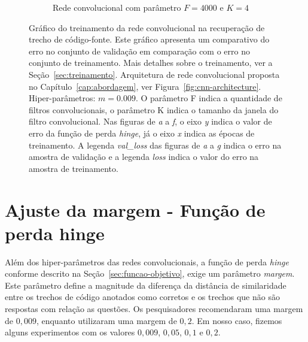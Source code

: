 \begin{figure}[H]
\begin{subfigure}{.5\textwidth}
  \caption{Rede convolucional com parâmetro $F = 4000$ e $K = 4$}
  \label{fig:cnn-4000-k-4}
\end{subfigure}
\caption{Gráfico do treinamento da rede convolucional na recuperação de trecho de código-fonte. Este gráfico apresenta um comparativo do erro no conjunto de validação em comparação com o erro no conjunto de treinamento. Mais detalhes sobre o treinamento, ver a Seção~\ref{sec:treinamento}. Arquitetura de rede convolucional proposta no Capítulo~\ref{cap:abordagem}, ver Figura~\ref{fig:cnn-architecture}. Hiper-parâmetros: $m = 0.009$. O parâmetro F indica a quantidade de filtros convolucionais, o parâmetro K indica o tamanho da janela do filtro convolucional. Nas figuras de \emph{a} a \emph{f}, o eixo \emph{y} indica o valor de erro da função de perda \textit{hinge}, já o eixo \emph{x} indica as épocas de treinamento. A legenda \emph{val\_loss} das figuras de \emph{a} a \emph{g} indica o erro na amostra de validação e a legenda \emph{loss} indica o valor do erro na amostra de treinamento. }
\label{fig:treinamento-cnn-diferentes-kernels-2}
\end{figure}



\section{Ajuste da margem - Função de perda hinge}

Além dos hiper-parâmetros das redes convolucionais, a função de perda \textit{hinge} conforme descrito na Seção~\ref{sec:funcao-objetivo}, exige um parâmetro \emph{margem}. Este parâmetro define a magnitude da diferença da distância de similaridade entre os trechos de código anotados como corretos e os trechos que não são respostas com relação as questões. Os pesquisadores \cite{feng-2015} recomendaram uma margem de $0,009$, enquanto \cite{tan-lstm-qa} utilizaram uma margem de $0,2$. Em nosso caso, fizemos alguns experimentos com os valores $0,009$, $0,05$, $0,1$ e $0,2$. 



